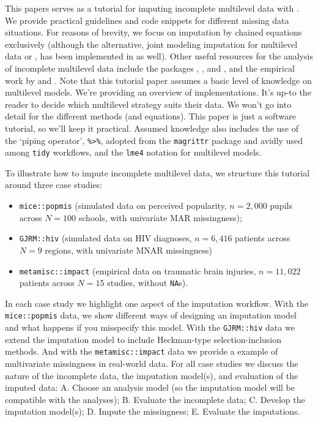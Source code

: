 \documentclass[
]{jss}
\providecommand{\tightlist}{%
  \setlength{\itemsep}{0pt}\setlength{\parskip}{0pt}}
\begin{document}
This papers serves as a tutorial for imputing incomplete multilevel data
with . We provide practical guidelines and code snippets for
different missing data situations. For reasons of brevity, we focus on
imputation by chained equations exclusively (although the alternative,
joint modeling imputation for multilevel data or 
\citet{jomo}, has been implemented in  as well). Other useful
resources for the analysis of incomplete multilevel data include the
 packages , , and , and
the empirical work by \citet{audi18} and \citet{grun18}. Note that this
tutorial paper assumes a basic level of knowledge on multilevel models.
We're providing an overview of implementations. It's up-to the reader to
decide which multilevel strategy suits their data. We won't go into
detail for the different methods (and equations). This paper is just a
software tutorial, so we'll keep it practical. Assumed knowledge also
includes the use of the `piping operator', \texttt{\%\textgreater{}\%},
adopted from the \texttt{magrittr} package and avidly used among
\texttt{tidy} workflows, and the \texttt{lme4} notation for multilevel
models.

To illustrate how to impute incomplete multilevel data, we structure
this tutorial around three case studies:

\begin{itemize}
\tightlist
\item
  \texttt{mice::popmis} (simulated data on perceived popularity,
  \(n = 2,000\) pupils across \(N = 100\) schools, with univariate MAR
  missingness);
\item
  \texttt{GJRM::hiv} (simulated data on HIV diagnoses, \(n = 6,416\)
  patients across \(N = 9\) regions, with univariate MNAR missingness)
\item
  \texttt{metamisc::impact} (empirical data on traumatic brain injuries,
  \(n = 11,022\) patients across \(N = 15\) studies, without
  \texttt{NA}s).
\end{itemize}

In each case study we highlight one aspect of the imputation workflow.
With the \texttt{mice::popmis} data, we show different ways of designing
an imputation model and what happens if you misspecify this model. With
the \texttt{GJRM::hiv} data we extend the imputation model to include
Heckman-type selection-inclusion methods. And with the
\texttt{metamisc::impact} data we provide a example of multivariate
missingness in real-world data. For all case studies we discuss the
nature of the incomplete data, the imputation model(s), and evaluation
of the imputed data: A. Choose an analysis model (so the imputation
model will be compatible with the analyses); B. Evaluate the incomplete
data; C. Develop the imputation model(s); D. Impute the missingness; E.
Evaluate the imputations.
\end{document}
